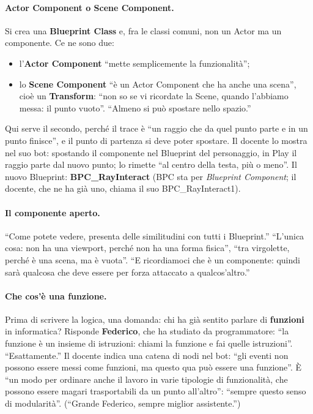 \paragraph{Actor Component o Scene Component.} Si crea una \textbf{Blueprint Class} e, fra
le classi comuni, non un Actor ma un componente. Ce ne sono due:
\begin{itemize}
  \item l'\textbf{Actor Component} ``mette semplicemente la funzionalità'';
  \item lo \textbf{Scene Component} ``è un Actor Component che ha anche una scena'',
        cioè un \textbf{Transform}: ``non so se vi ricordate la Scene, quando l'abbiamo
        messa: il punto vuoto''. ``Almeno si può spostare nello spazio.''
\end{itemize}
Qui serve il secondo, perché il trace è ``un raggio che da quel punto parte e in un punto
finisce'', e il punto di partenza si deve poter spostare. Il docente lo mostra nel suo bot:
spostando il componente nel Blueprint del personaggio, in Play il raggio parte dal nuovo
punto; lo rimette ``al centro della testa, più o meno''. Il nuovo Blueprint:
\textbf{BPC\_RayInteract} (BPC sta per \emph{Blueprint Component}; il docente, che ne ha già
uno, chiama il suo BPC\_RayInteract1).

\paragraph{Il componente aperto.} ``Come potete vedere, presenta delle similitudini con
tutti i Blueprint.'' ``L'unica cosa: non ha una viewport, perché non ha una forma fisica'',
``tra virgolette, perché è una scena, ma è vuota''. ``E ricordiamoci che è un componente:
quindi sarà qualcosa che deve essere per forza attaccato a qualcos'altro.''

\paragraph{Che cos'è una funzione.} Prima di scrivere la logica, una domanda: chi ha già
sentito parlare di \textbf{funzioni} in informatica? Risponde \textbf{Federico}, che ha
studiato da programmatore: ``la funzione è un insieme di istruzioni: chiami la funzione e
fai quelle istruzioni''. ``Esattamente.'' Il docente indica una catena di nodi nel bot: ``gli
eventi non possono essere messi come funzioni, ma questo qua può essere una funzione''. È
``un modo per ordinare anche il lavoro in varie tipologie di funzionalità, che possono
essere magari trasportabili da un punto all'altro'': ``sempre questo senso di modularità''.
(``Grande Federico, sempre miglior assistente.'')

